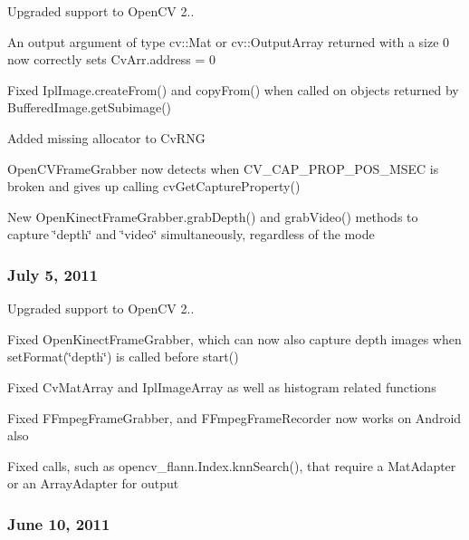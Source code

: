 \begin{DoxyItemize}
\item Upgraded support to Open\+C\+V 2..
\item An output argument of type {\ttfamily cv\+::\+Mat} or {\ttfamily cv\+::\+Output\+Array} returned with a size 0 now correctly sets {\ttfamily Cv\+Arr.\+address = 0}
\item Fixed {\ttfamily Ipl\+Image.\+create\+From()} and {\ttfamily copy\+From()} when called on objects returned by {\ttfamily Buffered\+Image.\+get\+Subimage()}
\item Added missing allocator to {\ttfamily Cv\+R\+N\+G}
\item {\ttfamily Open\+C\+V\+Frame\+Grabber} now detects when C\+V\+\_\+\+C\+A\+P\+\_\+\+P\+R\+O\+P\+\_\+\+P\+O\+S\+\_\+\+M\+S\+E\+C is broken and gives up calling {\ttfamily cv\+Get\+Capture\+Property()}
\item New {\ttfamily Open\+Kinect\+Frame\+Grabber.\+grab\+Depth()} and {\ttfamily grab\+Video()} methods to capture \char`\"{}depth\char`\"{} and \char`\"{}video\char`\"{} simultaneously, regardless of the mode
\end{DoxyItemize}

\subsubsection*{July 5, 2011}


\begin{DoxyItemize}
\item Upgraded support to Open\+C\+V 2..
\item Fixed {\ttfamily Open\+Kinect\+Frame\+Grabber}, which can now also capture depth images when {\ttfamily set\+Format(\char`\"{}depth\char`\"{})} is called before {\ttfamily start()}
\item Fixed {\ttfamily Cv\+Mat\+Array} and {\ttfamily Ipl\+Image\+Array} as well as histogram related functions
\item Fixed {\ttfamily F\+Fmpeg\+Frame\+Grabber}, and {\ttfamily F\+Fmpeg\+Frame\+Recorder} now works on Android also
\item Fixed calls, such as {\ttfamily opencv\+\_\+flann.\+Index.\+knn\+Search()}, that require a {\ttfamily Mat\+Adapter} or an {\ttfamily Array\+Adapter} for output
\end{DoxyItemize}

\subsubsection*{June 10, 2011}



